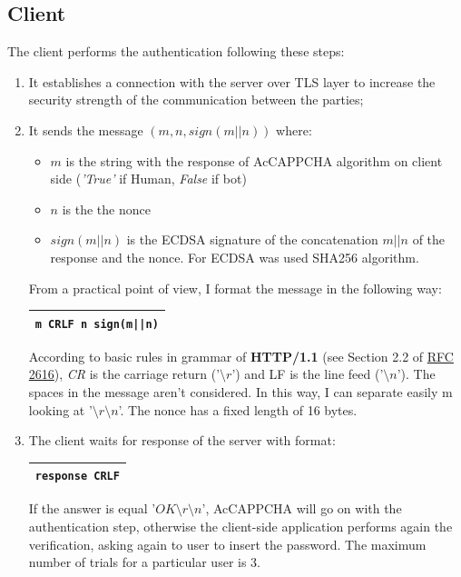 \subsection{Client}
The client performs the authentication following these steps:
\begin{enumerate}
\item{It establishes a connection with the server over TLS layer to increase the security strength of the communication between the parties;}
\item{It sends the message $(m, n, sign(m||n))$ where:
\begin{itemize}
\item{$m$ is the string with the response of AcCAPPCHA algorithm on client side (\textit{'True'} if Human, \textit{False} if bot)}
\item{$n$ is the the nonce}
\item{$sign(m||n)$ is the ECDSA signature of the concatenation $m||n$ of the response and the nonce. For ECDSA was used SHA256 algorithm.}
\end{itemize}
From a practical point of view, I format the message in the following way:
\begin{table}[H]
\centering\footnotesize
\begin{tabular}{|c|}
\hline
\texttt{m CRLF n sign(m||n)}\\
\hline
\end{tabular}
\end{table}
According to basic rules in grammar of \textbf{HTTP/1.1} (see Section 2.2 of \href{https://tools.ietf.org/html/rfc2616}{RFC 2616}), \textit{CR} is the carriage return ('$\setminus r$') and LF is the line feed ('$\setminus n$'). The spaces in the message aren't considered. In this way, I can separate easily m looking at '$\setminus r\setminus n$'. The nonce has a fixed length of 16 bytes.}
\item{The client waits for response of the server with format:
\begin{table}[H]
\centering\footnotesize
\begin{tabular}{|c|}
\hline
\texttt{response CRLF}\\
\hline
\end{tabular}
\end{table}
If the answer is equal '$OK\setminus r\setminus n$', AcCAPPCHA will go on with the authentication step, otherwise the client-side application performs again the verification, asking again to user to insert the password. The maximum number of trials for a particular user is 3.}

\end{enumerate}
